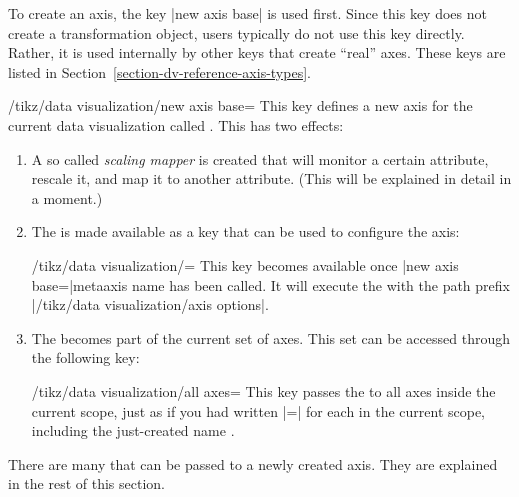 To create an axis, the key |new axis base| is used first. Since this key does
not create a transformation object, users typically do not use this key
directly. Rather, it is used internally by other keys that create ``real''
axes. These keys are listed in Section~\ref{section-dv-reference-axis-types}.

\begin{key}{/tikz/data visualization/new axis base=}
    This key defines a new axis for the current data visualization called
    . This has two effects:
    \begin{enumerate}
        \item A so called \emph{scaling mapper} is created that will monitor a
            certain attribute, rescale it, and map it to another attribute.
            (This will be explained in detail in a moment.)
        \item The  is made available as a key that can be used
            to configure the axis:
            \begin{key}{/tikz/data visualization/=}
                This key becomes available once |new axis base=|meta{axis name}
                has been called. It will execute the  with the
                path prefix |/tikz/data visualization/axis options|.
\begin{codeexample}
\end{codeexample}
            \end{key}
        \item The  becomes part of the current set of axes.
            This set can be accessed through the following key:
            \begin{key}{/tikz/data visualization/all axes=}
                This key passes the  to all axes inside the
                current scope, just as if you had written |=| for each  in the
                current scope, including the just-created name .
            \end{key}
    \end{enumerate}
    There are many  that can be passed to a newly created axis.
    They are explained in the rest of this section.
\end{key}

